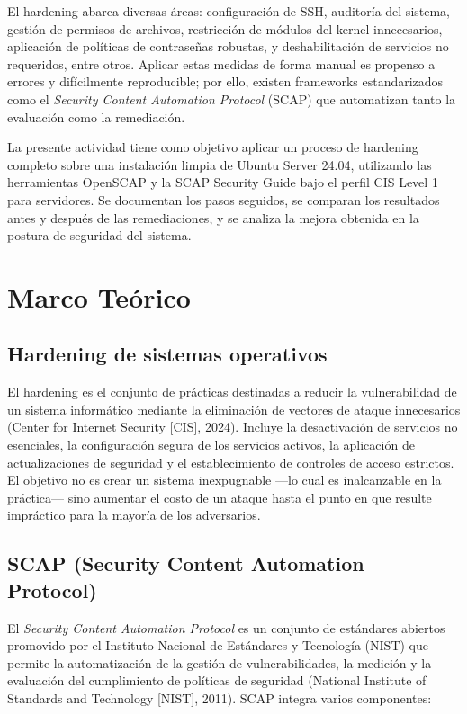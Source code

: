 \documentclass[12pt,letterpaper]{article}
\begin{document}
El hardening abarca diversas áreas: configuración de SSH, auditoría del sistema, gestión de permisos de archivos, restricción de módulos del kernel innecesarios, aplicación de políticas de contraseñas robustas, y deshabilitación de servicios no requeridos, entre otros. Aplicar estas medidas de forma manual es propenso a errores y difícilmente reproducible; por ello, existen frameworks estandarizados como el \textit{Security Content Automation Protocol} (SCAP) que automatizan tanto la evaluación como la remediación.

La presente actividad tiene como objetivo aplicar un proceso de hardening completo sobre una instalación limpia de Ubuntu Server 24.04, utilizando las herramientas OpenSCAP y la SCAP Security Guide bajo el perfil CIS Level 1 para servidores. Se documentan los pasos seguidos, se comparan los resultados antes y después de las remediaciones, y se analiza la mejora obtenida en la postura de seguridad del sistema.

\section{Marco Teórico}

\subsection{Hardening de sistemas operativos}

El hardening es el conjunto de prácticas destinadas a reducir la vulnerabilidad de un sistema informático mediante la eliminación de vectores de ataque innecesarios (Center for Internet Security [CIS], 2024). Incluye la desactivación de servicios no esenciales, la configuración segura de los servicios activos, la aplicación de actualizaciones de seguridad y el establecimiento de controles de acceso estrictos. El objetivo no es crear un sistema inexpugnable —lo cual es inalcanzable en la práctica— sino aumentar el costo de un ataque hasta el punto en que resulte impráctico para la mayoría de los adversarios.

\subsection{SCAP (Security Content Automation Protocol)}

El \textit{Security Content Automation Protocol} es un conjunto de estándares abiertos promovido por el Instituto Nacional de Estándares y Tecnología (NIST) que permite la automatización de la gestión de vulnerabilidades, la medición y la evaluación del cumplimiento de políticas de seguridad (National Institute of Standards and Technology [NIST], 2011). SCAP integra varios componentes:
\end{document}
